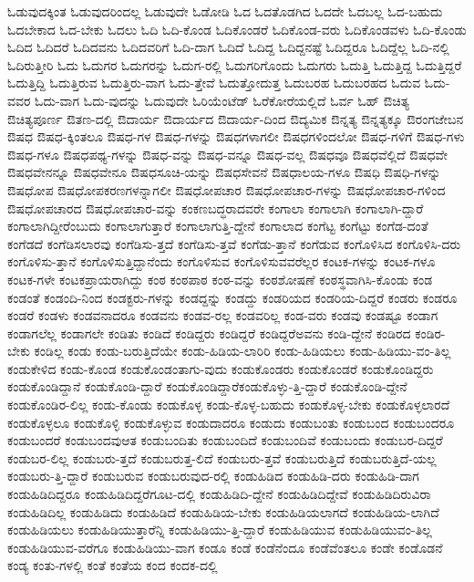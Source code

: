 {ಓಡುವುದಕ್ಕಿಂತ
ಓಡುವುದರಿಂದಲ್ಲ
ಓಡುವುದೇ
ಓಡೋಡಿ
ಓದ
ಓದತೊಡಗಿದ
ಓದದೇ
ಓದಬಲ್ಲ
ಓದ-ಬಹುದು
ಓದಬೇಕಾದ
ಓದ-ಬೇಕು
ಓದಲು
ಓದಿ
ಓದಿ-ಕೊಂಡ
ಓದಿಕೊಂಡರೆ
ಓದಿಕೊಂಡ-ವರು
ಓದಿಕೊಂಡವಳು
ಓದಿ-ಕೊಂಡು
ಓದಿದ
ಓದಿದರೆ
ಓದಿದವನು
ಓದಿದವರಿಗೆ
ಓದಿ-ದಾಗ
ಓದಿದೆ
ಓದಿದ್ದ
ಓದಿದ್ದನಷ್ಟೆ
ಓದಿದ್ದರೂ
ಓದಿದ್ದೆಲ್ಲ
ಓದಿ-ನಲ್ಲಿ
ಓದಿರುತ್ತೀರಿ
ಓದು
ಓದುಗರ
ಓದುಗರನ್ನು
ಓದುಗ-ರಲ್ಲಿ
ಓದುಗರಿಗೊಂದು
ಓದುಗರು
ಓದುತ್ತಿ
ಓದುತ್ತಿದ್ದ
ಓದುತ್ತಿದ್ದರೆ
ಓದುತ್ತಿದ್ದಿ
ಓದುತ್ತಿರುವ
ಓದುತ್ತಿರು-ವಾಗ
ಓದು-ತ್ತೇವೆ
ಓದುತ್ತೋದುತ್ತ
ಓದುಬರಹ
ಓದುಬರಹದ
ಓದುವ
ಓದು-ವವರ
ಓದು-ವಾಗ
ಓದು-ವುದನ್ನು
ಓದುವುದೇ
ಓರಿಯೆಂಟೆಡ್
ಓರೆಕೋರೆಯಲ್ಲಿದೆ
ಓರ್ವ
ಓಹ್
ಔಚಿತ್ಯ
ಔಚಿತ್ಯಪೂರ್ಣ
ಔತಣ-ದಲ್ಲಿ
ಔದಾರ್ಯ
ಔದಾರ್ಯದ
ಔದಾರ್ಯ-ದಿಂದ
ಔದ್ಯಮಿಕ
ಔನ್ನತ್ಯ
ಔನ್ನತ್ಯಕ್ಕೂ
ಔರಂಗಜೇಬನ
ಔಷಧ
ಔಷಧ-ಕ್ಕಿಂತಲೂ
ಔಷಧ-ಗಳ
ಔಷಧ-ಗಳನ್ನು
ಔಷಧಗಳಾಗಲೀ
ಔಷಧಗಳಿಂದಲೋ
ಔಷಧ-ಗಳಿಗೆ
ಔಷಧ-ಗಳು
ಔಷಧ-ಗಳೂ
ಔಷಧಪಥ್ಯ-ಗಳನ್ನು
ಔಷಧ-ವನ್ನು
ಔಷಧ-ವನ್ನೂ
ಔಷಧ-ವಲ್ಲ
ಔಷಧವೂ
ಔಷಧವೆಲ್ಲಿದೆ
ಔಷಧವೇ
ಔಷಧವೇನನ್ನೂ
ಔಷಧವೇನೂ
ಔಷಧಸೂಚಿ-ಯನ್ನು
ಔಷಧಸೇವನೆ
ಔಷಧಾಲಯ-ಗಳೂ
ಔಷಧಿ
ಔಷಧಿ-ಗಳನ್ನು
ಔಷಧೋಪ
ಔಷಧೋಪಕರಣಗಳನ್ನಾಗಲೀ
ಔಷಧೋಪಚಾರ
ಔಷಧೋಪಚಾರ-ಗಳನ್ನು
ಔಷಧೋಪಚಾರ-ಗಳಿಂದ
ಔಷಧೋಪಚಾರದ
ಔಷಧೋಪಚಾರ-ವನ್ನು
ಕಂಕಣಬದ್ಧರಾದವರೇ
ಕಂಗಾಲಾ
ಕಂಗಾಲಾಗಿ
ಕಂಗಾಲಾಗಿ-ದ್ದಾರೆ
ಕಂಗಾಲಾಗಿದ್ದೀರೆಂಬುದು
ಕಂಗಾಲಾಗುತ್ತಾರೆ
ಕಂಗಾಲಾಗುತ್ತಿ-ದ್ದೇನೆ
ಕಂಗಾಲಾದ
ಕಂಗೆಟ್ಟ
ಕಂಗೆಟ್ಟು
ಕಂಗೆಡ-ದಂತೆ
ಕಂಗೆಡದೆ
ಕಂಗೆಡಿಸಲಾರವು
ಕಂಗೆಡಿಸು-ತ್ತದೆ
ಕಂಗೆಡಿಸು-ತ್ತವೆ
ಕಂಗೆಡು-ತ್ತಾನೆ
ಕಂಗೆಡುವ
ಕಂಗೊಳಿಸಿದ
ಕಂಗೊಳಿಸಿ-ದರು
ಕಂಗೊಳಿಸು-ತ್ತಾನೆ
ಕಂಗೊಳಿಸುತ್ತಿದ್ದಾನೆಂದು
ಕಂಗೊಳಿಸುವ
ಕಂಗೊಳಿಸುವವರೆಲ್ಲರ
ಕಂಟಕ-ಗಳನ್ನು
ಕಂಟಕ-ಗಳೂ
ಕಂಟಕ-ಗಳೇ
ಕಂಟಕಪ್ರಾಯರಾಗಿದ್ದು
ಕಂಠ
ಕಂಠಪಾಠ
ಕಂಠ-ವನ್ನು
ಕಂಠಶೋಷಣೆ
ಕಂಠಸ್ಥವಾಗಿಸಿ-ಕೊಂಡು
ಕಂಡ
ಕಂಡಂತೆ
ಕಂಡಂದಿ-ನಿಂದ
ಕಂಡಕ್ಟರು-ಗಳನ್ನು
ಕಂಡದ್ದನ್ನು
ಕಂಡದ್ದು
ಕಂಡರಿಯದ
ಕಂಡರಿಯ-ದಿದ್ದರೆ
ಕಂಡರು
ಕಂಡರೂ
ಕಂಡರೆ
ಕಂಡಳು
ಕಂಡವನಾದರೂ
ಕಂಡವನು
ಕಂಡವ-ರಲ್ಲ
ಕಂಡವರಿಲ್ಲ
ಕಂಡ-ವರು
ಕಂಡವು
ಕಂಡಷ್ಟೂ
ಕಂಡಾಗ
ಕಂಡಾಗಲೆಲ್ಲ
ಕಂಡಾಗಲೇ
ಕಂಡಿತು
ಕಂಡಿದೆ
ಕಂಡಿದ್ದರು
ಕಂಡಿದ್ದರೆ
ಕಂಡಿದ್ದರೆಅವನು
ಕಂಡಿ-ದ್ದೇನೆ
ಕಂಡಿರದ
ಕಂಡಿರ-ಬೇಕು
ಕಂಡಿಲ್ಲ
ಕಂಡು
ಕಂಡು-ಬರುತ್ತಿದೆಯೇ
ಕಂಡು-ಹಿಡಿಯ-ಲಾರಿರಿ
ಕಂಡು-ಹಿಡಿಯಲು
ಕಂಡು-ಹಿಡಿಯು-ವಂ-ತಿಲ್ಲ
ಕಂಡುಕೇಳಿದ
ಕಂಡು-ಕೊಂಡ
ಕಂಡುಕೊಂಡಂತಾಗು-ವುದು
ಕಂಡುಕೊಂಡರು
ಕಂಡುಕೊಂಡರೆ
ಕಂಡುಕೊಂಡಿದ್ದರು
ಕಂಡುಕೊಂಡಿದ್ದಾನೆ
ಕಂಡುಕೊಂಡಿ-ದ್ದಾರೆ
ಕಂಡುಕೊಂಡಿದ್ದಾರೆಕಂಡುಕೊಳ್ಳು-ತ್ತಿ-ದ್ದಾರೆ
ಕಂಡುಕೊಂಡಿ-ದ್ದೇನೆ
ಕಂಡುಕೊಂಡಿರ-ಲಿಲ್ಲ
ಕಂಡು-ಕೊಂಡು
ಕಂಡುಕೊಳ್ಳ
ಕಂಡು-ಕೊಳ್ಳ-ಬಹುದು
ಕಂಡುಕೊಳ್ಳ-ಬೇಕು
ಕಂಡುಕೊಳ್ಳಲಾರದೆ
ಕಂಡುಕೊಳ್ಳಲೂ
ಕಂಡುಕೊಳ್ಳಿ
ಕಂಡುಕೊಳ್ಳುವ
ಕಂಡುದಾದರೂ
ಕಂಡುದು
ಕಂಡುಬಂತು
ಕಂಡುಬಂದ
ಕಂಡುಬಂದರೂ
ಕಂಡುಬಂದರೆ
ಕಂಡುಬಂದವುಆತ
ಕಂಡುಬಂದಿತು
ಕಂಡುಬಂದಿದೆ
ಕಂಡುಬಂದಿವೆ
ಕಂಡುಬಂದು
ಕಂಡುಬರ-ದಿದ್ದರೆ
ಕಂಡುಬರ-ಲಿಲ್ಲ
ಕಂಡುಬರು-ತ್ತದೆ
ಕಂಡುಬರುತ್ತ-ಲಿದೆ
ಕಂಡುಬರು-ತ್ತವೆ
ಕಂಡುಬರುತ್ತಿದೆ
ಕಂಡುಬರುತ್ತಿದೆ-ಯಲ್ಲ
ಕಂಡುಬರು-ತ್ತಿ-ದ್ದಾರೆ
ಕಂಡುಬರುವ
ಕಂಡುಬರುವುದ-ರಲ್ಲಿ
ಕಂಡುಹಿಡಿದ
ಕಂಡುಹಿಡಿ-ದರು
ಕಂಡುಹಿಡಿ-ದಾಗ
ಕಂಡುಹಿಡಿದಿದ್ದರೂ
ಕಂಡುಹಿಡಿದಿದ್ದರೆಗೂಟ-ದಲ್ಲಿ
ಕಂಡುಹಿಡಿದಿ-ದ್ದೇನೆ
ಕಂಡುಹಿಡಿದಿದ್ದೇವೆ
ಕಂಡುಹಿಡಿದಿರುವಿರಾ
ಕಂಡುಹಿಡಿದಿಲ್ಲ
ಕಂಡುಹಿಡಿದು
ಕಂಡುಹಿಡಿದೆ
ಕಂಡುಹಿಡಿಯ-ಬೇಕು
ಕಂಡುಹಿಡಿಯಲಾಗದೆ
ಕಂಡುಹಿಡಿಯ-ಲಾಗಿದೆ
ಕಂಡುಹಿಡಿಯಲು
ಕಂಡುಹಿಡಿಯುತ್ತಾರೆನ್ನಿ
ಕಂಡುಹಿಡಿಯು-ತ್ತಿ-ದ್ದಾರೆ
ಕಂಡುಹಿಡಿಯುವ
ಕಂಡುಹಿಡಿಯುವಂ-ತಿಲ್ಲ
ಕಂಡುಹಿಡಿಯುವ-ವರೆಗೂ
ಕಂಡುಹಿಡಿಯು-ವಾಗ
ಕಂಡೂ
ಕಂಡೆ
ಕಂಡೆನೆಂದೂ
ಕಂಡೆವೆಂತಲೂ
ಕಂಡೇ
ಕಂಡೊಡನೆ
ಕಂಡ್ಯ
ಕಂತು-ಗಳಲ್ಲಿ
ಕಂತೆ
ಕಂತೆಯ
ಕಂದ
ಕಂದಕ-ದಲ್ಲಿ
}
